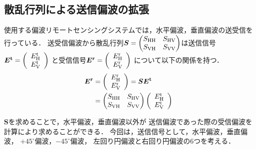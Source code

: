 \documentclass[uplatex,a4paper,12pt]{jsarticle}
\begin{document}
\subsection{散乱行列による送信偏波の拡張}
使用する偏波リモートセンシングシステムでは，水平偏波，垂直偏波の送受信を行っている．
送受信偏波から散乱行列$\bm{S} = 
\begin{pmatrix}
    S_{\rm{HH}} & S_{\rm{HV}} \\
    S_{\rm{VH}} & S_{\rm{VV}} \\
\end{pmatrix}
    $は送信信号$\bm{E^{\rm{t}}} =
\left(
    \begin{array}{c}
        E_{\rm{H}}^{\rm{t}}\\
        E_{\rm{V}}^{\rm{t}}
    \end{array}
\right)$
  と受信信号$\bm{E^{\rm{r}}} =
\left(
    \begin{array}{c}
        E_{\rm{H}}^{\rm{r}}\\
        E_{\rm{V}}^{\rm{r}}
    \end{array}
\right)$
  について以下の関係を持つ．
\begin{align}\label{equa:9}
    \bm{E^{\rm{r}}} &= 
    \left(
    \begin{array}{c}
        E_{\rm{H}}^{\rm{r}}\\
        E_{\rm{V}}^{\rm{r}}
    \end{array}
    \right)
     = \bm{S}\bm{E^{\rm{t}}} \\
     &=  
    \begin{pmatrix}
        S_{\rm{HH}} & S_{\rm{HV}} \\
        S_{\rm{VH}} & S_{\rm{VV}} \\
    \end{pmatrix}
    \left(
    \begin{array}{c}
        E_{\rm{H}}^{\rm{t}}\notag \\
        E_{\rm{V}}^{\rm{t}}
    \end{array}
    \right)
\end{align}

$\bm{S}$を求めることで，水平偏波，垂直偏波以外が
送信偏波であった際の受信偏波を計算により求めることができる．
今回は，送信信号として，水平偏波，垂直偏波，
$+45^\circ$偏波，$-45^\circ$偏波，
左回り円偏波と右回り円偏波の6つを考える．
\end{document}

